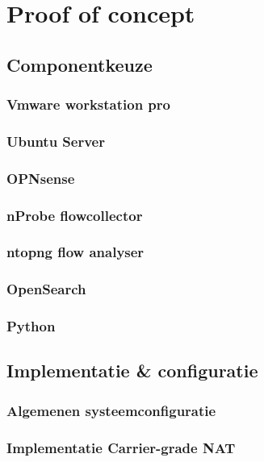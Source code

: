 \chapter{Proof of concept}
\section{Componentkeuze}
\subsection{Vmware workstation pro}

\subsection{Ubuntu Server}

\subsection{OPNsense}

\subsection{nProbe flowcollector}

\subsection{ntopng flow analyser}

\subsection{OpenSearch}

\subsection{Python}

\section{Implementatie \& configuratie}
\subsection{Algemenen systeemconfiguratie}

\subsection{Implementatie Carrier-grade NAT}

